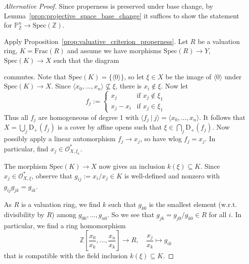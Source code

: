 \documentclass{scrartcl}
\newcommand{\Z}{\mathbb{Z}}
\newcommand{\D}[1]{\mathrm{D}_+(#1)}
\renewcommand{\P}{\mathbb{P}}
\newcommand{\Spec}{\mathrm{Spec}}
\newcommand{\Frac}{\mathrm{Frac}}
\renewcommand{\O}{\mathcal{O}}
\theoremstyle{definition}
\begin{document}
\begin{proof}[Alternative Proof]
    Since properness is preserved under base change, by Lemma~\ref{prop:projective_space_base_change} it suffices to show the statement for $\P_\Z^n \to \Spec(\Z)$.

    Apply Proposition~\ref{prop:valuative_criterion_properness}.
    Let $R$ be a valuation ring, $K = \Frac(R)$ and assume we have morphisms $\Spec(R) \to Y$, $\Spec(K) \to X$ such that the diagram
    \begin{center}
    \end{center}
    commutes.
    Note that $\Spec(K) = \{ \langle 0 \rangle \}$, so let $\xi \in X$ be the image of $\langle 0 \rangle$ under $\Spec(K) \to X$.
    Since $\langle x_0, ..., x_n \rangle \not\subseteq \xi$, there is $x_i \not\in \xi$.
    Now let
    \begin{equation*}
        f_j := \begin{cases}
            x_j & \text{if $x_j \notin \xi_1$} \\
            x_j - x_i & \text{if $x_j \in \xi_1$}
        \end{cases}
    \end{equation*}
    Thus all $f_j$ are homogeneous of degree 1 with $\langle f_j \ | \ j \rangle = \langle x_0, ..., x_n \rangle$.
    It follows that $X = \bigcup_j \D{f_j}$ is a cover by affine opens such that $\xi \in \bigcap_j \D{f_j}$.
    Now possibly apply a linear automorphism $f_j \to x_j$, so have wlog $f_j = x_j$.
    In particular, find $x_j \in \O_{X, \xi_1}^*$.

    The morphism $\Spec(K) \to X$ now gives an inclusion $k(\xi) \subseteq K$.
    Since $x_j \in \O_{X, \xi}^*$, observe that $g_{ij} := x_i / x_j \in K$ is well-defined and nonzero with $g_{ij} g_{jk} = g_{ik}$.

    As $R$ is a valuation ring, we find $k$ such that $g_{k0}$ is the smallest element (w.r.t. divisibility by $R$) among $g_{00}, ..., g_{n0}$.
    So we see that $g_{jk} = g_{j0} / g_{k0} \in R$ for all $i$.
    In particular, we find a ring homomorphism
    \begin{equation*}
        \Z\left[ \frac {x_0} {x_k}, ..., \frac {x_n} {x_k} \right] \to R, \quad \frac {x_j} {x_k} \mapsto g_{i k}
    \end{equation*}
    that is compatible with the field inclusion $k(\xi) \subseteq K$.


\end{proof}
\end{document}

